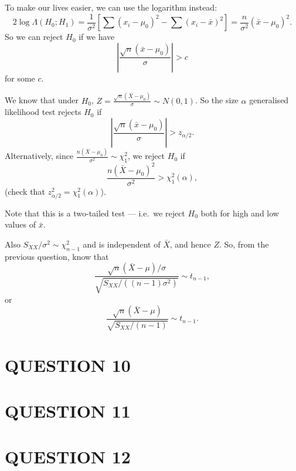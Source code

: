 \documentclass[a4paper]{article}
\begin{document}
To make our lives easier, we can use the logarithm instead:
\[
2\log \Lambda(H_0;H_1) = \frac{1}{\sigma^2}\left[\sum (x_i - \mu_0)^2 - \sum (x_i - \bar x)^2\right] = \frac{n}{\sigma^2}(\bar x - \mu_0)^2.
\]
So we can reject $H_0$ if we have
\[
\left|\frac{\sqrt{n}(\bar x - \mu_0)}{\sigma}\right| > c
\]
for some $c$.

We know that under $H_0$, $\displaystyle Z = \frac{\sqrt{n}(\bar X - \mu_0)}{\sigma}\sim N(0, 1)$. So the size $\alpha$ generalised likelihood test rejects $H_0$ if
\[
\left|\frac{\sqrt{n}(\bar x - \mu_0)}{\sigma}\right| > z_{\alpha/2}.
\]
Alternatively, since $\displaystyle \frac{n(\bar X - \mu_0)}{\sigma^2}\sim \chi_1^2$, we reject $H_0$ if
\[
\frac{n(\bar X - \mu_0)^2}{\sigma^2} > \chi_1^2(\alpha),
\]
(check that $z_{\alpha/2}^2 = \chi_1^2(\alpha)$).

Note that this is a two-tailed test --- i.e.\ we reject $H_0$ both for high and low values of $\bar x$.

Also $S_{XX}/\sigma^2 \sim \chi^2_{n - 1}$ and is independent of $\bar X$, and hence $Z$. So, from the previous question, know that
\[
\frac{\sqrt{n}(\bar X - \mu)/\sigma}{\sqrt{S_{XX}/((n - 1)\sigma^2)}} \sim t_{n - 1},
\]
or
\[
\frac{\sqrt{n}(\bar X - \mu)}{\sqrt{S_{XX}/(n - 1)}} \sim t_{n - 1}.
\]


\section{QUESTION 10}
\section{QUESTION 11}
\section{QUESTION 12}
\end{document}
